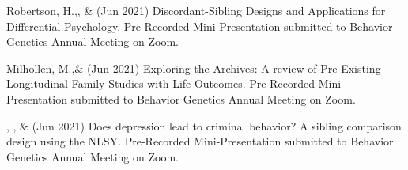 
\item Robertson, H.,\noteA \Joe, \&  \meb (Jun 2021) Discordant-Sibling Designs and Applications for Differential Psychology. Pre-Recorded Mini-Presentation submitted to Behavior Genetics Annual Meeting on Zoom.

\item Milhollen, M.,\noteA \&  \meb (Jun 2021) Exploring the Archives: A review of Pre-Existing Longitudinal Family Studies with Life Outcomes. Pre-Recorded Mini-Presentation submitted to Behavior Genetics Annual Meeting on Zoom.

\item \emsims, \jt,  \&  \meb (Jun 2021) Does depression lead to criminal behavior? A sibling comparison design using the NLSY. Pre-Recorded Mini-Presentation submitted to Behavior Genetics Annual Meeting on Zoom.

